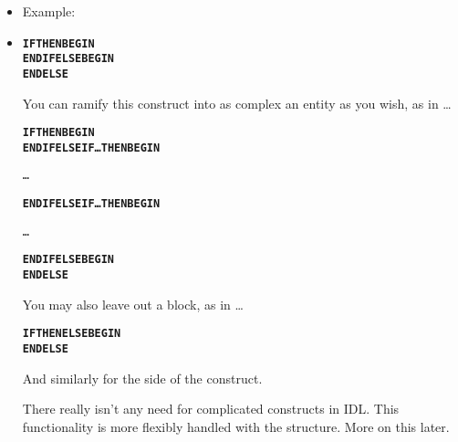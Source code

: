    \begin{itemize}
      \item {}


        Example: 



      \item {}


        \begin{alltt}

            \textbf{IF \T THEN BEGIN}
            \textbf{ENDIF ELSE BEGIN}
            \textbf{ENDELSE}

        \end{alltt}

        You can ramify this construct into as complex an entity as you
        wish, as in \ldots


        \begin{alltt}

            \textbf{IF \T THEN BEGIN}
            \textbf{ENDIF ELSE IF \ldots THEN BEGIN }

                \ldots

            \textbf{ENDIF ELSE IF \ldots THEN BEGIN }

                \ldots 

            \textbf{ENDIF ELSE BEGIN}
            \textbf{ENDELSE}

        \end{alltt}


         You may also leave out a block, as in \ldots

        \begin{alltt}

            \textbf{IF \T THEN \E ELSE BEGIN}
            \textbf{ENDELSE}


        \end{alltt}


        And similarly for the  side of the construct.

        There really isn't any need for complicated
         constructs in IDL. This
        functionality is more flexibly handled with the
         structure. More on this later.

    \end{itemize}


